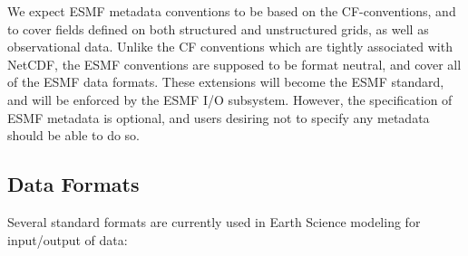 
We expect ESMF metadata conventions to be based on the CF-conventions,
and to cover fields defined on both structured and unstructured grids,
as well as observational data. Unlike the CF conventions which are
tightly associated with NetCDF, the ESMF conventions are supposed to
be format neutral, and cover all of the ESMF data formats.  These
extensions will become the ESMF standard, and will be enforced by the
ESMF I/O subsystem. However, the specification of ESMF metadata is
optional, and users desiring not to specify any metadata should be
able to do so.



\subsection{Data Formats}


Several standard formats are currently used in Earth Science modeling
for input/output of data:

